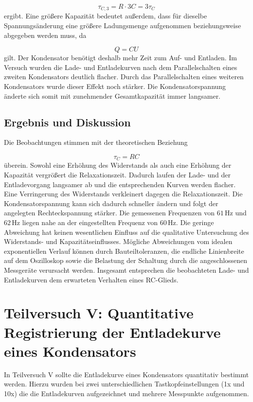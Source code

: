 \documentclass{report}
\begin{document}
\begin{equation}
\tau_{C,3}
=
R\cdot3C
=
3\tau_C
\end{equation}
\noindent
ergibt.
\noindent
Eine größere Kapazität bedeutet außerdem, dass für dieselbe Spannungsänderung eine größere Ladungsmenge aufgenommen beziehungsweise abgegeben werden muss, da

\begin{equation}
Q=CU
\end{equation}
\noindent
gilt. Der Kondensator benötigt deshalb mehr Zeit zum Auf- und Entladen.
\noindent
Im Versuch wurden die Lade- und Entladekurven nach dem Parallelschalten eines zweiten Kondensators deutlich flacher. Durch das Parallelschalten eines weiteren Kondensators wurde dieser Effekt noch stärker. Die Kondensatorspannung änderte sich somit mit zunehmender Gesamtkapazität immer langsamer.

\subsection{Ergebnis und Diskussion}
\noindent
Die Beobachtungen stimmen mit der theoretischen Beziehung

\begin{equation}
\tau_C=RC
\end{equation}
\noindent
überein. Sowohl eine Erhöhung des Widerstands als auch eine Erhöhung der Kapazität vergrößert die Relaxationszeit. Dadurch laufen der Lade- und der Entladevorgang langsamer ab und die entsprechenden Kurven werden flacher.
\noindent
Eine Verringerung des Widerstands verkleinert dagegen die Relaxationszeit. Die Kondensatorspannung kann sich dadurch schneller ändern und folgt der angelegten Rechteckspannung stärker.
\noindent
Die gemessenen Frequenzen von $61\,\mathrm{Hz}$ und $62\,\mathrm{Hz}$ liegen nahe an der eingestellten Frequenz von $60\,\mathrm{Hz}$. Die geringe Abweichung hat keinen wesentlichen Einfluss auf die qualitative Untersuchung des Widerstands- und Kapazitätseinflusses.
\noindent
Mögliche Abweichungen vom idealen exponentiellen Verlauf können durch Bauteiltoleranzen, die endliche Linienbreite auf dem Oszilloskop sowie die Belastung der Schaltung durch die angeschlossenen Messgeräte verursacht werden. Insgesamt entsprechen die beobachteten Lade- und Entladekurven dem erwarteten Verhalten eines RC-Glieds.

\newpage
\section{Teilversuch V: Quantitative Registrierung der Entladekurve eines Kondensators}
In Teilversuch V sollte die Entladekurve eines Kondensators quantitativ bestimmt werden. Hierzu wurden bei zwei unterschiedlichen 
Tastkopfeinstellungen (1x und 10x) die die Entladekurven aufgezeichnet und mehrere Messpunkte aufgenommen. 
\end{document}

